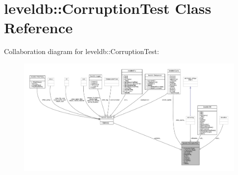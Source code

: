 \hypertarget{classleveldb_1_1_corruption_test}{}\section{leveldb\+::Corruption\+Test Class Reference}
\label{classleveldb_1_1_corruption_test}


Collaboration diagram for leveldb\+::Corruption\+Test\+:
\nopagebreak
\begin{figure}[H]
\begin{center}
\leavevmode
\includegraphics[width=350pt]{classleveldb_1_1_corruption_test__coll__graph}
\end{center}
\end{figure}
